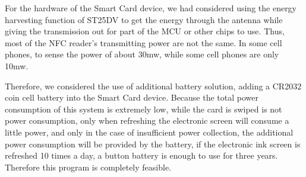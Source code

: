\documentclass[11pt, a4paper]{article}
\begin{document}
For the hardware of the Smart Card device, we had considered using the energy harvesting function of ST25DV to get the energy through the antenna while giving the transmission out for part of the MCU or other chips to use. Thus, most of the NFC reader's transmitting power are not the same. In some cell phones, to sense the power of about 30mw, while some cell phones are only 10mw.

Therefore, we considered the use of additional battery solution, adding a CR2032 coin cell battery into the Smart Card device. Because the total power consumption of this system is extremely low, while the card is swiped is not power consumption, only when refreshing the electronic screen will consume a little power, and only in the case of insufficient power collection, the additional power consumption will be provided by the battery, if the electronic ink screen is refreshed 10 times a day, a button battery is enough to use for three years. Therefore this program is completely feasible.


\nocite{*}
\printbibliography
\end{document}
